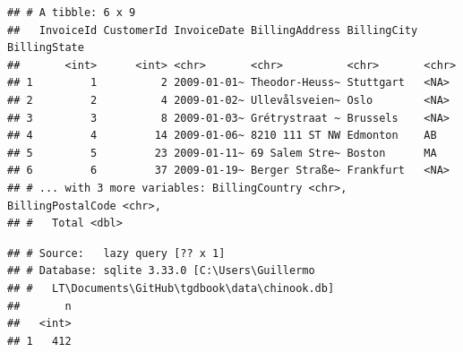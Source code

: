\documentclass[
]{book}
\newenvironment{Shaded}{\begin{snugshade}}{\end{snugshade}}
\newcommand{\CommentTok}[1]{\textcolor[rgb]{0.56,0.35,0.01}{\textit{#1}}}
\newcommand{\NormalTok}[1]{#1}
\newcommand{\OperatorTok}[1]{\textcolor[rgb]{0.81,0.36,0.00}{\textbf{#1}}}
\newcommand{\StringTok}[1]{\textcolor[rgb]{0.31,0.60,0.02}{#1}}
\begin{document}
\begin{verbatim}
## # A tibble: 6 x 9
##   InvoiceId CustomerId InvoiceDate BillingAddress BillingCity BillingState
##       <int>      <int> <chr>       <chr>          <chr>       <chr>       
## 1         1          2 2009-01-01~ Theodor-Heuss~ Stuttgart   <NA>        
## 2         2          4 2009-01-02~ Ullevålsveien~ Oslo        <NA>        
## 3         3          8 2009-01-03~ Grétrystraat ~ Brussels    <NA>        
## 4         4         14 2009-01-06~ 8210 111 ST NW Edmonton    AB          
## 5         5         23 2009-01-11~ 69 Salem Stre~ Boston      MA          
## 6         6         37 2009-01-19~ Berger Straße~ Frankfurt   <NA>        
## # ... with 3 more variables: BillingCountry <chr>, BillingPostalCode <chr>,
## #   Total <dbl>
\end{verbatim}

\begin{Shaded}
\end{Shaded}

\begin{verbatim}
## # Source:   lazy query [?? x 1]
## # Database: sqlite 3.33.0 [C:\Users\Guillermo
## #   LT\Documents\GitHub\tgdbook\data\chinook.db]
##       n
##   <int>
## 1   412
\end{verbatim}
\end{document}
